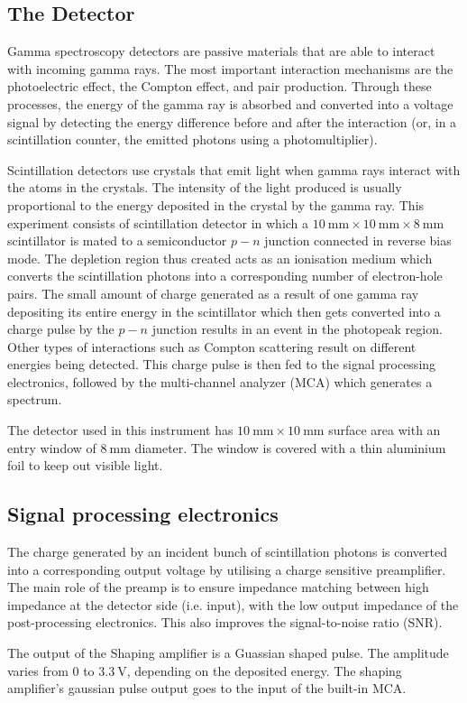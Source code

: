 \documentclass[%
 reprint,
nofootinbib,
 amsmath,amssymb,
 aps,
floatfix,
]{revtex4-2}
\begin{document}
    \subsection{The Detector}
    Gamma spectroscopy detectors are passive materials that are able to interact with incoming gamma rays. The most important interaction mechanisms are the photoelectric effect, the Compton effect, and pair production. Through these processes, the energy of the gamma ray is absorbed and converted into a voltage signal by detecting the energy difference before and after the interaction (or, in a scintillation counter, the emitted photons using a photomultiplier).
    \par
    Scintillation detectors use crystals that emit light when gamma rays interact with the atoms in the crystals. The intensity of the light produced is usually proportional to the energy deposited in the crystal by the gamma ray. This experiment consists of scintillation detector in which a $\SI{10}{\milli \metre} \times \SI{10}{\milli \metre} \times \SI{8}{\milli \metre}$ scintillator is mated to a semiconductor $p-n$ junction connected in reverse bias mode. The depletion region thus created acts as an ionisation medium which converts the scintillation photons into a corresponding number of electron-hole pairs. The small amount of charge generated as a result of one gamma ray depositing its entire energy in the scintillator which then gets converted into a charge pulse by the $p-n$ junction results in an event in the photopeak region. Other types of interactions such as Compton scattering result on different energies being detected. This charge pulse is then fed to the signal processing electronics, followed by the multi-channel analyzer (MCA) which generates a spectrum.
    \par
    The detector used in this instrument has $\SI{10}{\milli \metre} \times \SI{10}{\milli \metre}$ surface area with an entry window of $\SI{8}{\milli \metre}$ diameter. The window is covered with a thin aluminium foil to keep out visible light.
    \subsection{Signal processing electronics}
    The charge generated by an incident bunch of scintillation photons is converted into a corresponding output voltage by utilising a charge sensitive preamplifier. The main role of the preamp is to ensure impedance matching between high impedance at the detector side (i.e. input), with the low output impedance of the post-processing electronics. This also improves the signal-to-noise ratio (SNR).
    \par
    The output of the Shaping amplifier is a Guassian shaped pulse. The amplitude varies from 0 to $\SI{3.3}{\volt}$, depending on the deposited energy. The shaping amplifier’s gaussian pulse output goes to the input of the built-in MCA.
\end{document}
